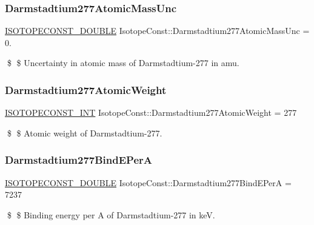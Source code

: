 \subsubsection{\texorpdfstring{Darmstadtium277\+Atomic\+Mass\+Unc}{Darmstadtium277AtomicMassUnc}}
{\footnotesize\ttfamily \mbox{\hyperlink{group___isotope_const-_macros_ga8f45a7272ce02c0b4c65c44636ed719a}{I\+S\+O\+T\+O\+P\+E\+C\+O\+N\+S\+T\+\_\+\+D\+O\+U\+B\+LE}} Isotope\+Const\+::\+Darmstadtium277\+Atomic\+Mass\+Unc = 0.}

\$ \$ Uncertainty in atomic mass of Darmstadtium-\/277 in amu. \mbox{\label{group___isotope_const-_darmstadtium-_ds277_ga5ad2cca04d68e89198be78655ad8842d}} 
\subsubsection{\texorpdfstring{Darmstadtium277\+Atomic\+Weight}{Darmstadtium277AtomicWeight}}
{\footnotesize\ttfamily \mbox{\hyperlink{group___isotope_const-_macros_ga5f18360b3e99483a35c32d789e62621c}{I\+S\+O\+T\+O\+P\+E\+C\+O\+N\+S\+T\+\_\+\+I\+NT}} Isotope\+Const\+::\+Darmstadtium277\+Atomic\+Weight = 277}

\$ \$ Atomic weight of Darmstadtium-\/277. \mbox{\label{group___isotope_const-_darmstadtium-_ds277_ga2c722d562d8826825cbbdaebab3e1ae6}} 
\subsubsection{\texorpdfstring{Darmstadtium277\+Bind\+E\+PerA}{Darmstadtium277BindEPerA}}
{\footnotesize\ttfamily \mbox{\hyperlink{group___isotope_const-_macros_ga8f45a7272ce02c0b4c65c44636ed719a}{I\+S\+O\+T\+O\+P\+E\+C\+O\+N\+S\+T\+\_\+\+D\+O\+U\+B\+LE}} Isotope\+Const\+::\+Darmstadtium277\+Bind\+E\+PerA = 7237}

\$ \$ Binding energy per A of Darmstadtium-\/277 in keV. \mbox{\label{group___isotope_const-_darmstadtium-_ds277_ga3b938ddd9a9709a12ce06727488c37d3}} 
